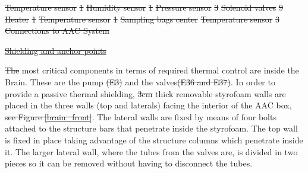 \documentclass[a4paper,12pt,twoside]{article}
\providecommand{\DIFaddtex}[1]{{\protect\color{blue}\uwave{#1}}} %
\providecommand{\DIFdeltex}[1]{{\protect\color{red}\sout{#1}}}                      %
\providecommand{\DIFaddbegin}{} %
\providecommand{\DIFaddend}{} %
\providecommand{\DIFdelbegin}{} %
\providecommand{\DIFdelend}{} %
\providecommand{\DIFdelFL}[1]{\DIFdel{#1}} %
\providecommand{\DIFadd}[1]{\texorpdfstring{\DIFaddtex{#1}}{#1}} %
\providecommand{\DIFdel}[1]{\texorpdfstring{\DIFdeltex{#1}}{}} %
\newcommand{\DIFscaledelfig}{0.5}
\newlength{\DIFdelgraphicswidth} %
\newlength{\DIFdelgraphicsheight} %
\newcommand{\DIFaddincludegraphics}[2][]{{\color{blue}\fbox{\DIFOincludegraphics[#1]{#2}}}} %
\newcommand{\DIFdelincludegraphics}[2][]{%
\sbox{\DIFdelgraphicsbox}{\DIFOincludegraphics[#1]{#2}}%
\settoboxwidth{\DIFdelgraphicswidth}{\DIFdelgraphicsbox} %
\settoboxtotalheight{\DIFdelgraphicsheight}{\DIFdelgraphicsbox} %
\scalebox{\DIFscaledelfig}{%
\parbox[b]{\DIFdelgraphicswidth}{\usebox{\DIFdelgraphicsbox}\\[-\baselineskip] \rule{\DIFdelgraphicswidth}{0em}}\llap{\resizebox{\DIFdelgraphicswidth}{\DIFdelgraphicsheight}{%
\setlength{\unitlength}{\DIFdelgraphicswidth}%
\begin{picture}(1,1)%
\thicklines\linethickness{2pt} %
{\color[rgb]{1,0,0}\put(0,0){\framebox(1,1){}}}%
{\color[rgb]{1,0,0}\put(0,0){\line( 1,1){1}}}%
{\color[rgb]{1,0,0}\put(0,1){\line(1,-1){1}}}%
\end{picture}%
}\hspace*{3pt}}} %
} %
\DeclareRobustCommand{\DIFaddbegin}{\DIFOaddbegin \let\includegraphics\DIFaddincludegraphics} %
\DeclareRobustCommand{\DIFaddend}{\DIFOaddend \let\includegraphics\DIFOincludegraphics} %
\DeclareRobustCommand{\DIFdelbegin}{\DIFOdelbegin \let\includegraphics\DIFdelincludegraphics} %
\DeclareRobustCommand{\DIFdelend}{\DIFOaddend \let\includegraphics\DIFOincludegraphics} %
\begin{document}
\DIFdelFL{Temperature sensor    }%
\DIFdelFL{1  }%
\DIFdelFL{Humidity sensor       }%
\DIFdelFL{1  }%
\DIFdelFL{Pressure sensor       }%
\DIFdelFL{3  }%
\DIFdelFL{Solenoid valves       }%
\DIFdelFL{9  }%
\DIFdelFL{Heater                }%
\DIFdelFL{1  }%
\DIFdelFL{Temperature sensor    }%
\DIFdelFL{1  }%
\DIFdelFL{Sampling bags center                                         }%
\DIFdelFL{Temperature sensor    }%
\DIFdelFL{3  }%
{%
\DIFdelFL{Connections to AAC System}}

\underline{\DIFdel{Shielding and anchor points}}

\DIFdel{The }\DIFdelend most critical components in terms of required thermal control are inside the Brain. These are the pump \DIFdelbegin \DIFdel{(E3) }\DIFdelend and the valves\DIFdelbegin \DIFdel{(E36 and E37)}\DIFdelend . In order to provide a passive thermal shielding, \DIFdelbegin \DIFdel{3cm }\DIFdelend \DIFaddbegin \DIFadd{3 cm }\DIFaddend thick removable styrofoam walls are placed in the three walls (top and laterals) facing the interior of the AAC box, \DIFdelbegin \DIFdel{see Figure \ref{brain_front}}\DIFdelend \DIFaddbegin \DIFadd{shown in Figure \ref{brain_isometric}}\DIFaddend . The lateral walls are fixed by means of four bolts attached to the structure bars that penetrate inside the styrofoam. The top wall is fixed in place taking advantage of the structure columns which penetrate inside it. The larger lateral wall, where the tubes from the valves are, is divided in two pieces so it can be removed without having to disconnect the tubes. 
\end{document}
